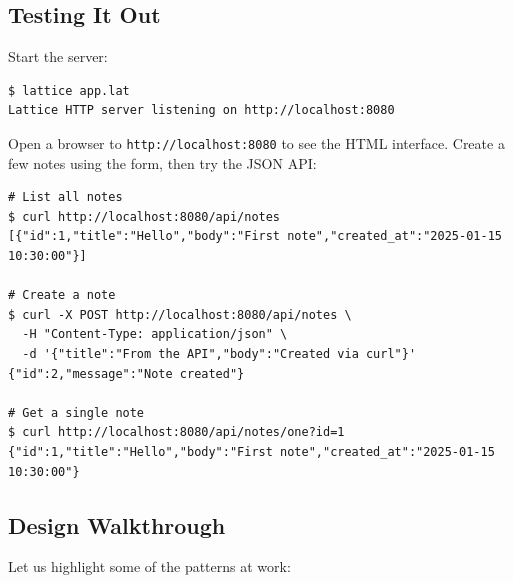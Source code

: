 \subsection{Testing It Out}\label{sec:webapp-testing}

Start the server:

\begin{lstlisting}[language={}, caption={Starting the application}]
$ lattice app.lat
Lattice HTTP server listening on http://localhost:8080
\end{lstlisting}

Open a browser to \texttt{http://localhost:8080} to see the HTML interface.
Create a few notes using the form, then try the JSON API:

\begin{lstlisting}[language={}, caption={Testing the JSON API with curl}]
# List all notes
$ curl http://localhost:8080/api/notes
[{"id":1,"title":"Hello","body":"First note","created_at":"2025-01-15 10:30:00"}]

# Create a note
$ curl -X POST http://localhost:8080/api/notes \
  -H "Content-Type: application/json" \
  -d '{"title":"From the API","body":"Created via curl"}'
{"id":2,"message":"Note created"}

# Get a single note
$ curl http://localhost:8080/api/notes/one?id=1
{"id":1,"title":"Hello","body":"First note","created_at":"2025-01-15 10:30:00"}
\end{lstlisting}

\subsection{Design Walkthrough}\label{sec:webapp-design}

Let us highlight some of the patterns at work:

